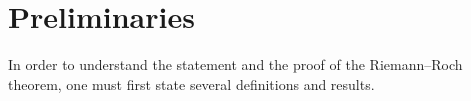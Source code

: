 \section{Preliminaries}

In order to understand the statement and the proof of the Riemann–Roch theorem,
one must first state several definitions and results.










